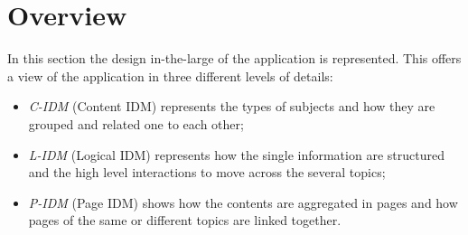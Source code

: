 \documentclass[../../DD.tex]{subfiles}
\begin{document}
\section{Overview}
	In this section the design in-the-large of the application is represented. This offers a view of the application in three different levels of details: 
	\begin{itemize}
		\item \textit{C-IDM} (Content IDM) represents the types of subjects and how they are grouped and related one to each other; 
		\item \textit{L-IDM} (Logical IDM) represents how the single information are structured and the high level interactions to move across the several topics;
		\item \textit{P-IDM} (Page IDM) shows how the contents are aggregated in pages and how pages of the same or different topics are linked together.
	\end{itemize}
\end{document}
